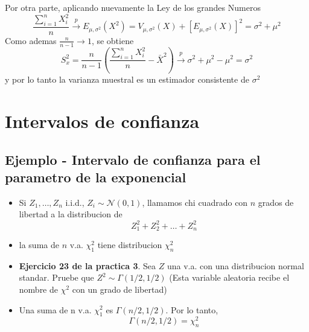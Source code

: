\documentclass[a4paper]{article}
\begin{document}
Por otra parte, aplicando nuevamente la Ley de los grandes Numeros
\begin{equation*}
    \frac{\sum_{i=1}^n X_{i}^2}{n} \xrightarrow[]{p} E_{\mu, \sigma^2}(X^2) = V_{\mu, \sigma^2}(X) + [E_{\mu, \sigma^2}(X)]^2 = \sigma^2 + \mu^2
\end{equation*}
Como ademas $\frac{n}{n-1} \rightarrow 1$, se obtiene
\begin{equation*}
    S_{x}^2 = \frac{n}{n-1}(\frac{\sum_{i=1}^n X_{i}^2}{n} - \bar{X}^2) \xrightarrow[]{p} \sigma^2 + \mu^2 -\mu^2 = \sigma^2
\end{equation*}
y por lo tanto la varianza muestral es un estimador consistente de $\sigma^2$

\pagebreak
\section{Intervalos de confianza}

\subsection{Ejemplo - Intervalo de confianza para el parametro de la exponencial}
\begin{itemize}
    \item Si $Z_1,\dots,Z_n$ i.i.d., $Z_i \sim \mathcal{N}(0,1)$, llamamos chi cuadrado con $n$ grados de libertad a la distribucion de
    \begin{equation*}
        Z_1^2 + Z_2^2 + \dots + Z_n^2
    \end{equation*}
    \item la suma de $n$ v.a. $\chi_1^2$ tiene distribucion $\chi_n^2$
    \item \textbf{Ejercicio 23 de la practica 3}. Sea $Z$ una v.a. con una distribucion normal standar. Pruebe que $Z^2 \sim \Gamma(1/2, 1/2)$
    (Esta variable aleatoria recibe el nombre de $\chi^2$ con un grado de libertad)
    \item Una suma de n v.a. $\chi_1^2$ es $\Gamma(n/2, 1/2)$. Por lo tanto,
    \begin{equation*}
        \Gamma(n/2, 1/2) = \chi_n^2
    \end{equation*}
\end{itemize}
\end{document}
